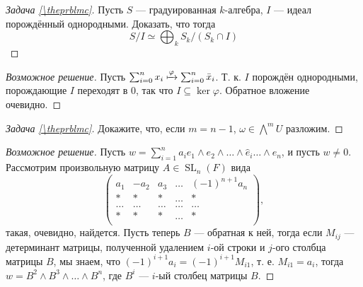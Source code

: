 \documentclass{article}
\theoremstyle{definition}
\theoremstyle{remark}
\newenvironment{solution}
{\begin{proof}[Возможное решение]}
{\end{proof}}
\newcounter{prblmc}
\newenvironment{prblm}
{\renewcommand{\qedsymbol}{}\begin{proof}[Задача \rm{\ref{\theprblmc}}]}
{\stepcounter{prblmc} \end{proof}}
\DeclareMathOperator{\SL}{SL}
\newcommand{\inter}{\cap}
\begin{document}
\begin{prblm}
    Пусть $S$ --- градуированная $k$-алгебра, $I$ --- идеал порождённый однородными. Доказать, что тогда
    \begin{equation*}
	S / I \simeq \bigoplus_k S_k / (S_k \inter I)
    \end{equation*}
\end{prblm}
\begin{solution}
	Пусть $\sum_{i = 0}^n x_i \xmapsto{\varphi} \sum_{i = 0}^n \bar{x}_i$. Т. к. $I$ порождён однородными, порождающие $I$ переходят в 0, так что $I \subseteq \ker \varphi$. Обратное вложение очевидно.
\end{solution}

\begin{prblm}
Докажите, что, если $m = n - 1$, $\omega \in \bigwedge^m U$ разложим.
\end{prblm}
\begin{solution}
Пусть $w = \sum_{i = 1}^n a_i e_1 \wedge e_2 \wedge \ldots \wedge \widehat{e}_i \ldots \wedge e_n$, и пусть $w \neq 0$. Рассмотрим произвольную матрицу $A \in \SL_n(F)$ вида
\begin{equation*}
\begin{pmatrix}
a_1 & -a_2 & a_3 & \ldots & (-1)^{n + 1} a_n \\
* & * & * & \ldots & * \\
\ldots & \ldots & \ldots & \ldots & \ldots \\
* & * & * & \ldots & * \\
\end{pmatrix}
,
\end{equation*}
	такая, очевидно, найдется. Пусть теперь $B$ --- обратная к ней, тогда если $M_{ij}$ --- детерминант матрицы, полученной удалением $i$-ой строки и $j$-ого столбца матрицы $B$, мы знаем, что $(-1)^{i + 1} a_i = (-1)^{i + 1} M_{i1}$, т. е. $M_{i1} = a_i$, тогда $w = B^2 \wedge B^3 \wedge \ldots \wedge B^n$, где $B^i$ --- $i$-ый столбец матрицы $B$.
\end{solution}
\end{document}
